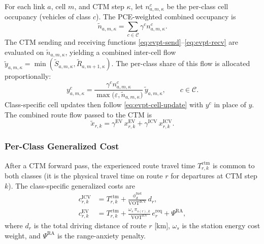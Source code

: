 For each link \(a\), cell \(m\), and CTM step \(\kappa\), let
\(n^c_{a,m,\kappa}\) be the per-class cell occupancy (vehicles of
class \(c\)). The PCE-weighted combined occupancy is
\begin{equation}
  \tilde{n}_{a,m,\kappa}
  = \sum_{c\in\mathcal{C}} \gamma^c n^c_{a,m,\kappa}.
  \label{eq:evpt-pce-occ}
\end{equation}
The CTM sending and receiving functions
\eqref{eq:evpt-send}--\eqref{eq:evpt-recv} are evaluated on
\(\tilde{n}_{a,m,\kappa}\), yielding a combined inter-cell flow
\(\tilde{y}_{a,m,\kappa}=\min(\tilde{S}_{a,m,\kappa},\tilde{R}_{a,m+1,\kappa})\).
The per-class share of this flow is allocated proportionally:
\begin{equation}
  y^c_{a,m,\kappa}
  = \frac{\gamma^c n^c_{a,m,\kappa}}{\max\bigl(\varepsilon,\tilde{n}_{a,m,\kappa}\bigr)}
    \,\tilde{y}_{a,m,\kappa},
  \qquad c\in\mathcal{C}.
  \label{eq:evpt-per-class-flow}
\end{equation}
Class-specific cell updates then follow \eqref{eq:evpt-cell-update}
with \(y^c\) in place of \(y\). The combined route flow passed to the CTM is
\begin{equation}
  \tilde{x}_{r,k} = \gamma^{\mathrm{EV}}\, x^{\mathrm{EV}}_{r,k}
                  + \gamma^{\mathrm{ICV}}\, x^{\mathrm{ICV}}_{r,k}.
  \label{eq:evpt-combined-route-flow}
\end{equation}

\subsubsection{Per-Class Generalized Cost}

After a CTM forward pass, the experienced route travel time
\(T^{\mathrm{ctm}}_{r,k}\) is common to both classes (it is the
physical travel time on route \(r\) for departures at CTM step \(k\)).
The class-specific generalized costs are
\begin{align}
  c^{\mathrm{ICV}}_{r,k}
  &= T^{\mathrm{ctm}}_{r,k}
   + \frac{\phi^{\mathrm{fuel}}_d}{\mathrm{VOT}^{\mathrm{ICV}}}\,d_r,
  \label{eq:evpt-icv-cost} \\
  c^{\mathrm{EV}}_{r,k}
  &= T^{\mathrm{ctm}}_{r,k}
   + \frac{\omega_s\,\pi_{s(r),k}}{\mathrm{VOT}^{\mathrm{EV}}}\,e^{\mathrm{req}}_{r}
   + \Psi^{\mathrm{RA}},
  \label{eq:evpt-ev-cost}
\end{align}
where \(d_r\) is the total driving distance of route \(r\) [km],
\(\omega_s\) is the station energy cost weight, and
\(\Psi^{\mathrm{RA}}\) is the range-anxiety penalty.

